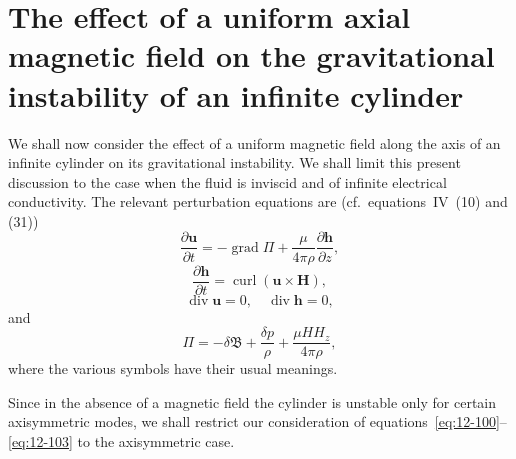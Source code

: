 \section{The effect of a uniform axial magnetic field on the gravitational instability of an infinite cylinder}\label{sec:110}
We shall now consider the effect of a uniform magnetic field along the axis of an infinite cylinder on its gravitational instability. We shall limit this present discussion to the case when the fluid is inviscid and of infinite electrical conductivity. The relevant perturbation equations are (cf.\ equations~IV~(10) and (31))
\begin{equation}
\label{eq:12-100}
\frac{\partial \mathbf{u}}{\partial t} = -\operatorname{grad} \Pi + \frac{\mu}{4\pi\rho}\frac{\partial \mathbf{h}}{\partial z},
\end{equation}
\begin{equation}
\label{eq:12-101}
\frac{\partial \mathbf{h}}{\partial t} = \operatorname{curl}(\mathbf{u} \times \mathbf{H}),
\end{equation}
\begin{equation}
\label{eq:12-102}
\operatorname{div} \mathbf{u} = 0, \quad \operatorname{div} \mathbf{h} = 0,
\end{equation}
and
\begin{equation}
\label{eq:12-103}
\Pi = -\delta\mathfrak{B} + \frac{\delta p}{\rho} + \frac{\mu H H_z}{4\pi\rho},
\end{equation}
where the various symbols have their usual meanings.

Since in the absence of a magnetic field the cylinder is unstable only for certain axisymmetric modes, we shall restrict our consideration of equations~\eqref{eq:12-100}--\eqref{eq:12-103} to the axisymmetric case.

